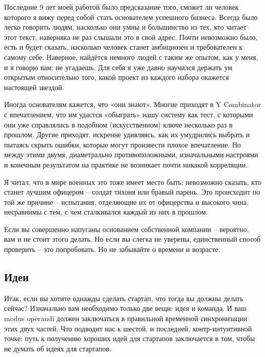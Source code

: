 \documentclass[ebook,12pt,oneside,openany]{memoir}
\begin{document}
Последние 9 лет моей работой было предсказание того, сможет ли человек
которого я вижу перед собой стать основателем успешного бизнеса.
Всегда было легко говорить людям, насколько они умны и большинство из
тех, кто читает этот текст, наверняка не раз слышали это в свой адрес.
Почти невозможно было, есть и будет сказать, насколько человек станет
амбициозен и требователен к самому себе. Наверное, найдётся немного
людей с таким же опытом, как у меня, и я говорю вам: не угадаешь. Для
себя я уже давно научился держать ум открытым относительно того, какой
проект из каждого набора окажется настоящей звездой. \newline

Иногда основателям кажется, что «они знают». Многие приходят в Y
Combinator с впечатлением, что им удастся «обыграть» нашу систему как
тест, с которыми они уже справлялись в подобном (искусственном) ключе
несколько раз в прошлом. Другие приходят, искренне удивляясь, как их
умудрились выбрать и пытаясь скрыть ошибки, которые могут произвести
плохое впечатление. Но между этими двумя, диаметрально
противоположными, изначальными настроями и конечным результатом на
практике не возникает почти никакой корреляции. \newline

Я читал, что в мире военных это тоже имеет место быть: невозможно
сказать, кто станет лучшим офицером – солдат тихоня или бравый парень.
Это происходит по той же причине – испытания, отделяющие их от
офицерства и высокого чина, несравнимы с тем, с чем сталкивался каждый
из них в прошлом. \newline

Если вы совершенно напуганы основанием собственной компании –
вероятно, вам и не стоит этого делать. Но если вы слегка не уверены,
единственный способ проверить – это попробовать. Но не забывайте о
времени и возрасте. \newline

\subsection{Идеи}

Итак, если вы хотите однажды сделать стартап, что тогда вы должны
делать сейчас? Изначально вам необходимо только две вещи: идея и
команда. И ваш modus operandi должен заключаться в правильной
временной синхронизации этих двух частей. Что подводит нас к шестой, и
последней, контр-интуитивной точке: путь к получению хороших идей для
стартапов заключается в том, чтобы не думать об идеях для стартапов. \newline
\end{document}
